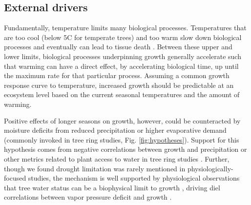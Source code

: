 \documentclass[11pt]{article}
\begin{document}
\subsection*{External drivers}

Fundamentally, temperature limits many biological processes. Temperatures that are too cool (below 5\degree C for temperate trees) and too warm \citep[an area of active research, but likely between 35-45\degree C;][]{martinez2008hot,cabon2022cross} slow down biological processes and eventually can lead to tissue death \citep[see Fig. \ref{fig:temperaturecomplex},][]{larcher1980,kramer2012book}. Between these upper and lower limits, biological processes underpinning growth generally accelerate such that warming can have a direct effect, by accelerating biological time, up until the maximum rate for that particular process. Assuming a common growth response curve to temperature, increased growth should be predictable at an ecosystem level based on the current seasonal temperatures and the amount of warming. 

Positive effects of longer seasons on growth, however, could be counteracted by moisture deficits from reduced precipitation or higher evaporative demand (commonly invoked in tree ring studies, Fig. \ref{fig:hypotheses}). Support for this hypothesis comes from negative correlations between growth and precipitation or other metrics related to plant access to water in tree ring studies \citep{kolavr2016response,etzold2022number}. Further, though we found drought limitation was rarely mentioned in physiologically-focused studies, the mechanism is well supported by physiological observations that tree water status can be a biophysical limit to growth \citep[i.e., cells cannot expand without sufficient turgor,][]{peters2021turgor,cosgrove2023structure}, driving diel correlations between vapor pressure deficit and growth \citep{babst2019twentieth,zweifel2021trees}.
\end{document}
